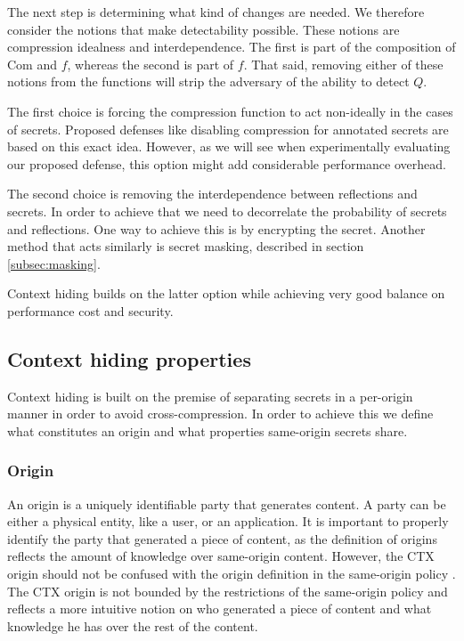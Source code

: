 The next step is determining what kind of changes are needed. We therefore
consider the notions that make detectability possible. These notions are
compression idealness and interdependence. The first is part of the composition
of $\textrm{Com}$ and $f$, whereas the second is part of $f$. That said, removing
either of these notions from the functions will strip the adversary of the ability
to detect $Q$.

The first choice is forcing the compression function to act non-ideally in the
cases of secrets. Proposed defenses like disabling compression for annotated
secrets are based on this exact idea. However, as we will see when experimentally
evaluating our proposed defense, this option might add considerable performance
overhead.

The second choice is removing the interdependence between reflections and
secrets. In order to achieve that we need to decorrelate the probability of
secrets and reflections. One way to achieve this is by encrypting the secret.
Another method that acts similarly is secret masking, described in section
\ref{subsec:masking}.

Context hiding builds on the latter option while achieving very good balance on
performance cost and security.

\subsection{Context hiding properties}

Context hiding is built on the premise of separating secrets in a per-origin
manner in order to avoid cross-compression. In order to achieve this we define
what constitutes an origin and what properties same-origin secrets share.

\subsubsection{Origin}
An origin is a uniquely identifiable party that generates content. A party can
be either a physical entity, like a user, or an application. It is important to
properly identify the party that generated a piece of content, as the definition
of origins reflects the amount of knowledge over same-origin content.
However, the CTX origin should not be confused with the origin definition in the
same-origin policy \cite{ruderman2001same}. The CTX origin is not bounded by the
restrictions of the same-origin policy and reflects a more intuitive notion on who
generated a piece of content and what knowledge he has over the rest of the
content.

